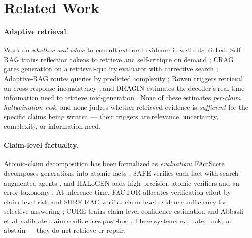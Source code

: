 ﻿%

\section{Related Work}
\label{sec:related}

\paragraph{Adaptive retrieval.}
Work on \emph{whether and when} to consult external evidence is well
established: Self-RAG trains reflection tokens to retrieve and self-critique
on demand \cite{asai2024selfrag}; CRAG gates generation on a
retrieval-quality evaluator with corrective search \cite{yan2024crag};
Adaptive-RAG routes queries by predicted complexity
\cite{jeong2024adaptiverag}; Rowen triggers retrieval on cross-response
inconsistency \cite{ding2025rowen}; and DRAGIN estimates the decoder's
real-time information need to retrieve mid-generation \cite{su2024dragin}.
None of these estimates \emph{per-claim hallucination risk}, and none judges
whether retrieved evidence is \emph{sufficient} for the specific claims
being written --- their triggers are relevance, uncertainty, complexity, or
information need.

\paragraph{Claim-level factuality.}
Atomic-claim decomposition has been formalized as \emph{evaluation}: FActScore
decomposes generations into atomic facts \cite{min2023factscore}, SAFE
verifies each fact with search-augmented agents
\cite{wei2024longformfactuality}, and HALoGEN adds high-precision atomic
verifiers and an error taxonomy \cite{ravichander2025halogen}. At inference
time, FACTOR allocates verification effort by claim-level risk
\cite{hassan2026factor} and SURE-RAG verifies claim-level evidence
sufficiency for selective answering \cite{qiu2026surerag}; CURE trains
claim-level confidence estimation \cite{liu2026cure} and Abbasli et al.
calibrate claim confidences post-hoc \cite{abbasli2026claimcalib}. These
systems evaluate, rank, or abstain --- they do not retrieve or repair.


